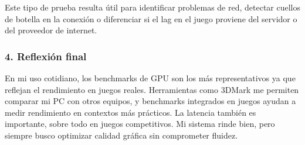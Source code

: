 Este tipo de prueba resulta útil para identificar problemas de red, detectar cuellos de botella en la conexión o diferenciar si el lag en el juego proviene del servidor o del proveedor de internet.


\subsubsection*{4. Reflexión final}
En mi uso cotidiano, los benchmarks de GPU son los más representativos ya que reflejan el rendimiento en juegos reales. Herramientas como 3DMark me permiten comparar mi PC con otros equipos, y benchmarks integrados en juegos ayudan a medir rendimiento en contextos más prácticos. La latencia también es importante, sobre todo en juegos competitivos. Mi sistema rinde bien, pero siempre busco optimizar calidad gráfica sin comprometer fluidez.
